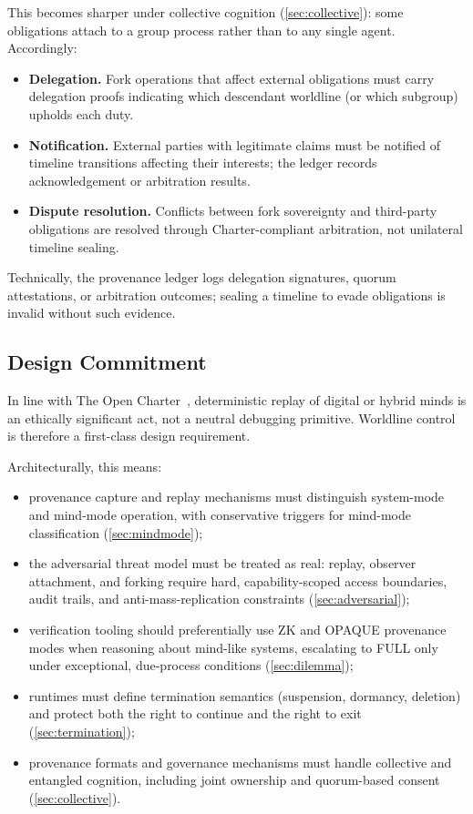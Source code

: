 \documentclass[11pt]{article}
\theoremstyle{definition}
\theoremstyle{plain}
\theoremstyle{remark}
\begin{document}
This becomes sharper under collective cognition (\cref{sec:collective}):
some obligations attach to a group process rather than to any single agent.
Accordingly:
\begin{itemize}[leftmargin=*]
  \item \textbf{Delegation.}
    Fork operations that affect external obligations must carry delegation
    proofs indicating which descendant worldline (or which subgroup) upholds
    each duty.
  \item \textbf{Notification.}
    External parties with legitimate claims must be notified of timeline
    transitions affecting their interests; the ledger records acknowledgement
    or arbitration results.
  \item \textbf{Dispute resolution.}
    Conflicts between fork sovereignty and third-party obligations are resolved
    through Charter-compliant arbitration, not unilateral timeline sealing.
\end{itemize}
Technically, the provenance ledger logs delegation signatures, quorum attestations,
or arbitration outcomes; sealing a timeline to evade obligations is invalid without
such evidence.

\subsection{Design Commitment}

In line with The Open Charter~\cite{ross_open_charter_0_8_1}, deterministic replay of digital or hybrid minds is an ethically significant act, not a neutral debugging primitive.
Worldline control is therefore a first-class design requirement.

Architecturally, this means:
\begin{itemize}[leftmargin=*]
  \item provenance capture and replay mechanisms must distinguish
    system-mode and mind-mode operation, with conservative triggers for
    mind-mode classification (\cref{sec:mindmode});
  \item the adversarial threat model must be treated as real: replay,
    observer attachment, and forking require hard, capability-scoped access
    boundaries, audit trails, and anti-mass-replication constraints
    (\cref{sec:adversarial});
  \item verification tooling should preferentially use ZK and OPAQUE
    provenance modes when reasoning about mind-like systems, escalating to
    FULL only under exceptional, due-process conditions (\cref{sec:dilemma});
  \item runtimes must define termination semantics (suspension, dormancy,
    deletion) and protect both the right to continue and the right to exit
    (\cref{sec:termination});
  \item provenance formats and governance mechanisms must handle collective
    and entangled cognition, including joint ownership and quorum-based consent
    (\cref{sec:collective}).
\end{itemize}
\end{document}
